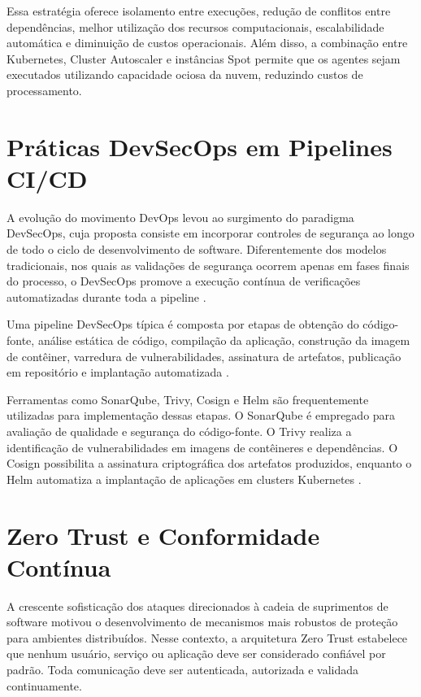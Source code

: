 Essa estratégia oferece isolamento entre execuções, redução de conflitos entre dependências, melhor utilização dos recursos computacionais, escalabilidade automática e diminuição de custos operacionais. Além disso, a combinação entre Kubernetes, Cluster Autoscaler e instâncias Spot permite que os agentes sejam executados utilizando capacidade ociosa da nuvem, reduzindo custos de processamento.

\section{Práticas DevSecOps em Pipelines CI/CD}
\label{sec:devsecops-relacionados}

A evolução do movimento DevOps levou ao surgimento do paradigma DevSecOps, cuja proposta consiste em incorporar controles de segurança ao longo de todo o ciclo de desenvolvimento de software. Diferentemente dos modelos tradicionais, nos quais as validações de segurança ocorrem apenas em fases finais do processo, o DevSecOps promove a execução contínua de verificações automatizadas durante toda a pipeline \cite{cyberark2024,appsec2024}.

Uma pipeline DevSecOps típica é composta por etapas de obtenção do código-fonte, análise estática de código, compilação da aplicação, construção da imagem de contêiner, varredura de vulnerabilidades, assinatura de artefatos, publicação em repositório e implantação automatizada \cite{devopsdev2024,devopsdevsec2024}.

Ferramentas como SonarQube, Trivy, Cosign e Helm são frequentemente utilizadas para implementação dessas etapas. O SonarQube é empregado para avaliação de qualidade e segurança do código-fonte. O Trivy realiza a identificação de vulnerabilidades em imagens de contêineres e dependências. O Cosign possibilita a assinatura criptográfica dos artefatos produzidos, enquanto o Helm automatiza a implantação de aplicações em clusters Kubernetes \cite{redhat2021,wasike2023}.

\section{Zero Trust e Conformidade Contínua}
\label{sec:zero-trust-relacionados}

A crescente sofisticação dos ataques direcionados à cadeia de suprimentos de software motivou o desenvolvimento de mecanismos mais robustos de proteção para ambientes distribuídos. Nesse contexto, a arquitetura Zero Trust estabelece que nenhum usuário, serviço ou aplicação deve ser considerado confiável por padrão. Toda comunicação deve ser autenticada, autorizada e validada continuamente.

